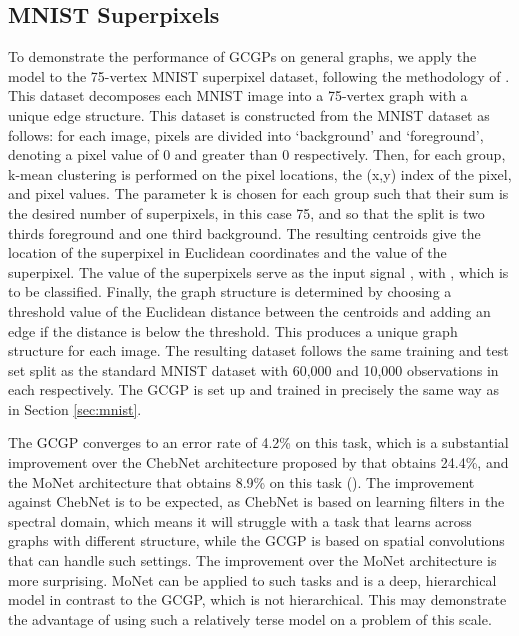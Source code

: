 \documentclass{article}
\begin{document}
\subsection{MNIST Superpixels}
To demonstrate the performance of GCGPs on general graphs, we apply the model to the 75-vertex MNIST superpixel dataset, following the methodology of \citet{moNet}. This dataset decomposes each MNIST image into a 75-vertex graph with a unique edge structure. This dataset is constructed from the MNIST dataset as follows: for each image, pixels are divided into `background' and `foreground', denoting a pixel value  of 0 and greater than 0 respectively. Then, for each group, k-mean clustering is performed on the pixel locations, the (x,y) index of the pixel, and pixel values. The parameter k is chosen for each group such that their sum is the desired number of superpixels, in this case 75, and so that the split is two thirds foreground and one third background. The resulting centroids give the location of the superpixel in Euclidean coordinates and the value of the superpixel. The value of the superpixels serve as the input signal , with , which is to be classified. Finally, the graph structure is determined by choosing a threshold value of the Euclidean distance between the centroids and adding an edge if the distance is below the threshold. This produces a unique graph structure for each image. The resulting dataset follows the same training and test set split as the standard MNIST dataset with 60,000 and 10,000 observations in each respectively. The GCGP is set up and trained in precisely the same way as in Section \ref{sec:mnist}. 

The GCGP converges to an error rate of 4.2\% on this task, which is a substantial improvement over the ChebNet architecture proposed by \citet{chebnet} that obtains 24.4\%, and the MoNet architecture that obtains 8.9\% on this task (\citet{moNet}). The improvement against ChebNet is to be expected, as ChebNet is based on learning filters in the spectral domain, which means it will struggle with a task that learns across graphs with different structure, while the GCGP is based on spatial convolutions that can handle such settings. The improvement over the MoNet architecture is more surprising. MoNet can be applied to such tasks and is a deep, hierarchical model in contrast to the GCGP, which is not hierarchical. This may demonstrate the advantage of using such a relatively terse model on a problem of this scale. 
\end{document}
